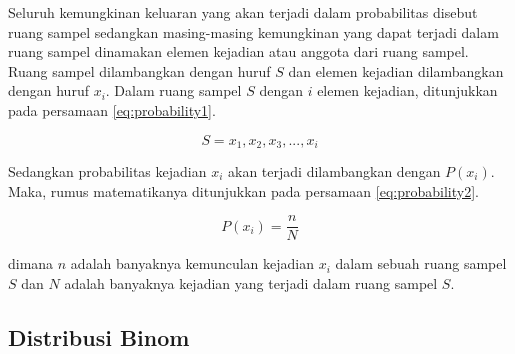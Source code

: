 Seluruh kemungkinan keluaran yang akan terjadi dalam probabilitas disebut ruang sampel sedangkan masing-masing kemungkinan yang dapat terjadi dalam ruang sampel dinamakan elemen kejadian atau anggota dari ruang sampel. Ruang sampel dilambangkan dengan huruf \begin{math}S\end{math} dan elemen kejadian dilambangkan dengan huruf \begin{math}x_i\end{math}. Dalam ruang sampel \begin{math}S\end{math} dengan \begin{math}i\end{math} elemen kejadian, ditunjukkan pada persamaan \ref{eq:probability1}.

\begin{equation}
	S = {x_1, x_2, x_3, ..., x_i}
	\label{eq:probability1}
\end{equation}

Sedangkan probabilitas kejadian \begin{math}x_i\end{math} akan terjadi dilambangkan dengan \begin{math}P(x_i)\end{math}. Maka, rumus matematikanya ditunjukkan pada persamaan \ref{eq:probability2}.

\begin{equation}
	P(x_i) = \frac{n}{N}
	\label{eq:probability2}
\end{equation}

\noindent dimana \begin{math}n\end{math} adalah banyaknya kemunculan kejadian \begin{math}x_i\end{math} dalam sebuah ruang sampel \begin{math}S\end{math} dan \begin{math}N\end{math} adalah banyaknya kejadian yang terjadi dalam ruang sampel \begin{math}S\end{math}.

\subsection{Distribusi Binom}

